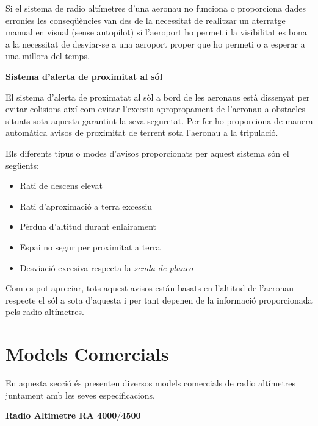 Si el sistema de radio altímetres d'una aeronau no funciona o proporciona dades erronies les conseqüències van des de la necessitat de realitzar un aterratge manual en visual (sense autopilot) si l'aeroport ho permet i la visibilitat es bona a la necessitat de desviar-se a una aeroport proper que ho permeti o a esperar a una millora del temps. 

\textbf{Sistema d'alerta de proximitat al sól}

El sistema d'alerta de proximatat al sòl a bord de les aeronaus està dissenyat per evitar colisions així com evitar l'excesiu apropropament de l'aeronau a obstacles situats sota aquesta garantint la seva seguretat. Per fer-ho proporciona de manera automàtica avisos de proximitat de terrent sota l'aeronau a la tripulació.  

Els diferents tipus o modes d'avisos proporcionats per aquest sistema són el següents:
\begin{itemize}
\item Rati de descens elevat
\item Rati d'aproximació a terra excessiu
\item Pèrdua d'altitud durant enlairament
\item Espai no segur per proximitat a terra
\item Desviació excesiva respecta la \textit{senda de planeo}
\end{itemize}
Com es pot apreciar, tots aquest avisos están basats en l'altitud de l'aeronau respecte el sól a sota d'aquesta i per tant depenen de la informació proporcionada pels radio altímetres. 


\section{Models Comercials}

En aquesta secció és presenten diversos models comercials de radio altímetres juntament amb les seves especificacions.

\textbf{Radio Altimetre RA 4000$/$4500}

